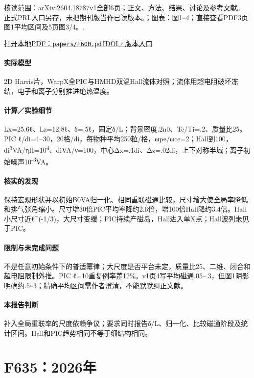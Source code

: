 \textsf{核读范围：}arXiv:2604.18787v1全部6页；正文、方法、结果、讨论及参考文献。正式PRL入口另存，未把期刊版当作已读版本。；\textsf{图表：}图1–4；直接查看PDF3页图1平均区间及5页图3/4。.

\href{run:papers/F600.pdf}{打开本地PDF：\texttt{papers/F600.pdf}}\quad\href{https://doi.org/10.1103/xpsr-4hqn}{DOI／版本入口}

\paragraph{实际模型}2D Harris片，WarpX全PIC与HMHD双温Hall流体对照；流体用超电阻破坏冻结，电子和离子分别推进绝热温度。

\paragraph{计算／实验细节}Lx=25.6ℓ、Lz=12.8ℓ、δ=.5ℓ，固定δ/L；背景密度.2n0、Te/Ti=.2、质量比25。PIC ℓ/di=1–30，20格/di，每物种平均250粒/格，ωpe/ωce=2；Hall到100，di\textsuperscript{3}VA/ηH=10\textsuperscript{4}、diVA/ν=100，中心Δx=.1di、Δz=.02di，上下对称半域；离子初始噪声10\textsuperscript{-3}VA。

\paragraph{核实的发现}保持宏观形状并以初始B0VA归一化、相同重联磁通比较，尺寸增大使全局率降低和排气张角缩小。尺寸增30倍PIC平均率降约2.6倍，增100倍Hall降约3.4倍。Hall小尺寸近ℓ\textasciicircum{}(-1/3)，大尺寸变缓；PIC持续产磁岛，Hall进入单X点；Hall波列未见于PIC。

\paragraph{限制与未完成问题}不是任意初始条件下的普适幂律；大尺度是否平台未定，质量比25、二维、闭合和超电阻限制外推。PIC ℓ=10重复例率差12\%。v1页4写平均磁通.05–.3，但图1阴影明确约.5–3；精确平均区间需作者澄清，不能默默纠正文献。

\paragraph{本报告判断}补入全局重联率的尺度依赖争议；要求同时报告δ/L、归一化、比较磁通阶段及统计区间。Hall和PIC趋势相同不等于细结构相同。

\section{F635：2026年}\label{paper:F635}

